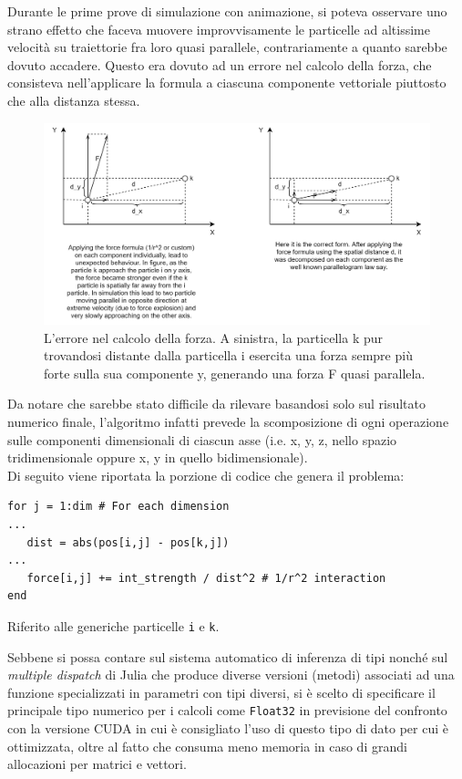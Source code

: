 \documentclass[11pt, a4paper]{article}
\begin{document}
Durante le prime prove di simulazione con animazione, si poteva osservare uno strano effetto che faceva muovere improvvisamente le particelle ad altissime velocità su traiettorie fra loro quasi parallele, contrariamente a quanto sarebbe dovuto accadere. Questo era dovuto ad un errore nel calcolo della forza, che consisteva nell'applicare la formula a ciascuna componente vettoriale piuttosto che alla distanza stessa.
\begin{figure}[ht]
\centering
\includegraphics[width=\textwidth]{images/ForceError.png}
\caption{L'errore nel calcolo della forza. A sinistra, la particella k pur trovandosi distante dalla particella i esercita una forza sempre più forte sulla sua componente y, generando una forza F quasi parallela.}
\label{forcerror}
\end{figure}
Da notare che sarebbe stato difficile da rilevare basandosi solo sul risultato numerico finale, l'algoritmo infatti prevede la scomposizione di ogni operazione sulle componenti dimensionali di ciascun asse (i.e. x, y, z, nello spazio tridimensionale oppure x, y in quello bidimensionale).\\
Di seguito viene riportata la porzione di codice che genera il problema:
\begin{verbatim}
for j = 1:dim # For each dimension
...
   dist = abs(pos[i,j] - pos[k,j])
...    
   force[i,j] += int_strength / dist^2 # 1/r^2 interaction
end
\end{verbatim}
Riferito alle generiche particelle \texttt{i} e \texttt{k}.

Sebbene si possa contare sul sistema automatico di inferenza di tipi nonché sul \emph{multiple dispatch} di Julia che produce diverse versioni (metodi) associati ad una funzione specializzati in parametri con tipi diversi, si è scelto di specificare il principale tipo numerico per i calcoli come \texttt{Float32} in previsione del confronto con la versione CUDA in cui è consigliato l'uso di questo tipo di dato per cui è ottimizzata, oltre al fatto che consuma meno memoria in caso di grandi allocazioni per matrici e vettori.  
\end{document}

